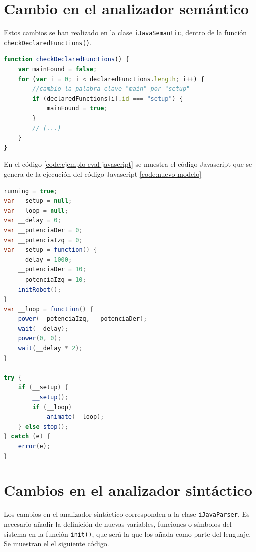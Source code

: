 \section*{Cambio en el analizador semántico}

Estos cambios se han realizado en la clase \texttt{iJavaSemantic}, dentro de la función \texttt{checkDeclaredFunctions()}. 

\begin{lstlisting}[language={Javascript},label={code:cambios-ijava-semantico}, caption={Código que muestra los cambios que se han realizado en la clase \texttt{iJavaSemantic} para cambiar la función principal \texttt{main} por \texttt{setup}.}]
function checkDeclaredFunctions() {
	var mainFound = false;
	for (var i = 0; i < declaredFunctions.length; i++) {
		//cambio la palabra clave "main" por "setup"
		if (declaredFunctions[i].id === "setup") {
			mainFound = true;
		}
		// (...)
	}
}
\end{lstlisting}

En el código \ref{code:ejemplo-eval-javascript} se muestra el código Javascript que se genera de la ejecución del código Javascript \ref{code:nuevo-modelo}


\begin{lstlisting}[language={Java},label={code:ejemplo-eval-javascript}, caption={Ejemplo de código Javascript que se genera cuando se ejecuta el código iJava \ref{code:nuevo-modelo}.}]
running = true;
var __setup = null;
var __loop = null;
var __delay = 0;
var __potenciaDer = 0;
var __potenciaIzq = 0;
var __setup = function() {
    __delay = 1000;
    __potenciaDer = 10;
    __potenciaIzq = 10;
    initRobot();
}
var __loop = function() {
    power(__potenciaIzq, __potenciaDer);
    wait(__delay);
    power(0, 0);
    wait(__delay * 2);
}

try {
    if (__setup) {
        __setup();
        if (__loop)
            animate(__loop);
    } else stop();
} catch (e) {
    error(e);
}
\end{lstlisting}

\section*{Cambios en el analizador sintáctico}

Los cambios en el analizador sintáctico corresponden a la clase \texttt{iJavaParser}. Es necesario añadir la definición de nuevas variables, funciones o símbolos del sistema en la función \texttt{init()}, que será la que los añada como parte del lenguaje. Se muestran el el siguiente código.


